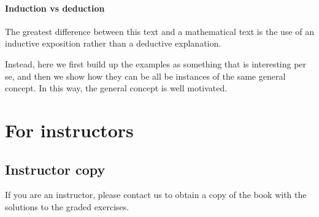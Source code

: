 \paragraph{Induction vs deduction}

The greatest difference between this text and a mathematical text is the use of an inductive exposition rather than a deductive explanation.

Instead, here we first build up the examples as something that is interesting per se, and then we show how they can be all be instances of the same general concept. In this way, the general concept is well motivated.

\section{For instructors}

\subsection{Instructor copy}
If you are an instructor, please contact us to obtain a copy of the book with the solutions to the graded exercises.


